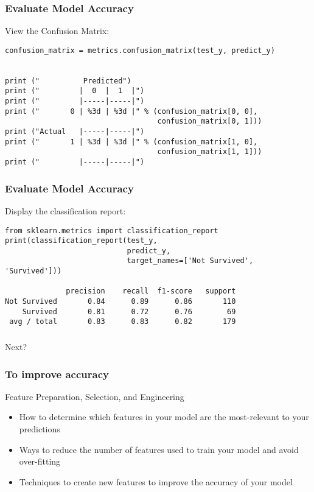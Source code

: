 \begin{frame}[fragile]\frametitle{Evaluate Model Accuracy}
View the Confusion Matrix:
\begin{lstlisting}
confusion_matrix = metrics.confusion_matrix(test_y, predict_y)


print ("          Predicted")
print ("         |  0  |  1  |")
print ("         |-----|-----|")
print ("       0 | %3d | %3d |" % (confusion_matrix[0, 0],
                                   confusion_matrix[0, 1]))
print ("Actual   |-----|-----|")
print ("       1 | %3d | %3d |" % (confusion_matrix[1, 0],
                                   confusion_matrix[1, 1]))
print ("         |-----|-----|")
\end{lstlisting}
\end{frame}


\begin{frame}[fragile]\frametitle{Evaluate Model Accuracy}
Display the classification report:
\begin{lstlisting}
from sklearn.metrics import classification_report
print(classification_report(test_y, 
                            predict_y, 
                            target_names=['Not Survived', 'Survived']))

              precision    recall  f1-score   support
Not Survived       0.84      0.89      0.86       110
    Survived       0.81      0.72      0.76        69
 avg / total       0.83      0.83      0.82       179                       
\end{lstlisting}
\end{frame}

\begin{frame}[fragile]\frametitle{}
\begin{center}
{\Large Next?}
\end{center}
\end{frame}

\begin{frame}[fragile]\frametitle{To improve accuracy}
Feature Preparation, Selection, and Engineering
\begin{itemize}
\item How to determine which features in your model are the most-relevant to your predictions
\item Ways to reduce the number of features used to train your model and avoid over-fitting
\item Techniques to create new features to improve the accuracy of your model
\end{itemize}
\end{frame}

